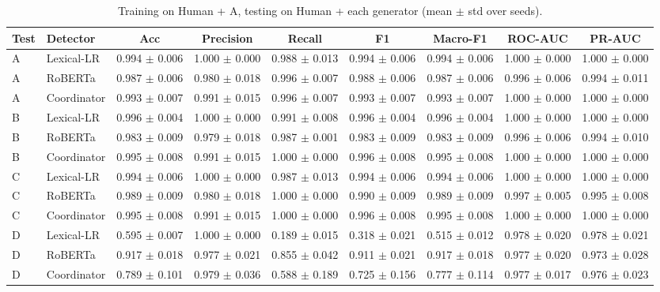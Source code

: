 \begin{table}[t]
\centering
\footnotesize
\caption{Training on Human + A, testing on Human + each generator (mean $\pm$ std over seeds).}
\label{tab:required}
\begin{tabular}{llccccccc}
\toprule
Test & Detector & Acc & Precision & Recall & F1 & Macro-F1 & ROC-AUC & PR-AUC \\
\midrule
A & Lexical-LR & 0.994 $\pm$ 0.006 & 1.000 $\pm$ 0.000 & 0.988 $\pm$ 0.013 & 0.994 $\pm$ 0.006 & 0.994 $\pm$ 0.006 & 1.000 $\pm$ 0.000 & 1.000 $\pm$ 0.000 \\
A & RoBERTa & 0.987 $\pm$ 0.006 & 0.980 $\pm$ 0.018 & 0.996 $\pm$ 0.007 & 0.988 $\pm$ 0.006 & 0.987 $\pm$ 0.006 & 0.996 $\pm$ 0.006 & 0.994 $\pm$ 0.011 \\
A & Coordinator & 0.993 $\pm$ 0.007 & 0.991 $\pm$ 0.015 & 0.996 $\pm$ 0.007 & 0.993 $\pm$ 0.007 & 0.993 $\pm$ 0.007 & 1.000 $\pm$ 0.000 & 1.000 $\pm$ 0.000 \\
B & Lexical-LR & 0.996 $\pm$ 0.004 & 1.000 $\pm$ 0.000 & 0.991 $\pm$ 0.008 & 0.996 $\pm$ 0.004 & 0.996 $\pm$ 0.004 & 1.000 $\pm$ 0.000 & 1.000 $\pm$ 0.000 \\
B & RoBERTa & 0.983 $\pm$ 0.009 & 0.979 $\pm$ 0.018 & 0.987 $\pm$ 0.001 & 0.983 $\pm$ 0.009 & 0.983 $\pm$ 0.009 & 0.996 $\pm$ 0.006 & 0.994 $\pm$ 0.010 \\
B & Coordinator & 0.995 $\pm$ 0.008 & 0.991 $\pm$ 0.015 & 1.000 $\pm$ 0.000 & 0.996 $\pm$ 0.008 & 0.995 $\pm$ 0.008 & 1.000 $\pm$ 0.000 & 1.000 $\pm$ 0.000 \\
C & Lexical-LR & 0.994 $\pm$ 0.006 & 1.000 $\pm$ 0.000 & 0.987 $\pm$ 0.013 & 0.994 $\pm$ 0.006 & 0.994 $\pm$ 0.006 & 1.000 $\pm$ 0.000 & 1.000 $\pm$ 0.000 \\
C & RoBERTa & 0.989 $\pm$ 0.009 & 0.980 $\pm$ 0.018 & 1.000 $\pm$ 0.000 & 0.990 $\pm$ 0.009 & 0.989 $\pm$ 0.009 & 0.997 $\pm$ 0.005 & 0.995 $\pm$ 0.008 \\
C & Coordinator & 0.995 $\pm$ 0.008 & 0.991 $\pm$ 0.015 & 1.000 $\pm$ 0.000 & 0.996 $\pm$ 0.008 & 0.995 $\pm$ 0.008 & 1.000 $\pm$ 0.000 & 1.000 $\pm$ 0.000 \\
D & Lexical-LR & 0.595 $\pm$ 0.007 & 1.000 $\pm$ 0.000 & 0.189 $\pm$ 0.015 & 0.318 $\pm$ 0.021 & 0.515 $\pm$ 0.012 & 0.978 $\pm$ 0.020 & 0.978 $\pm$ 0.021 \\
D & RoBERTa & 0.917 $\pm$ 0.018 & 0.977 $\pm$ 0.021 & 0.855 $\pm$ 0.042 & 0.911 $\pm$ 0.021 & 0.917 $\pm$ 0.018 & 0.977 $\pm$ 0.020 & 0.973 $\pm$ 0.028 \\
D & Coordinator & 0.789 $\pm$ 0.101 & 0.979 $\pm$ 0.036 & 0.588 $\pm$ 0.189 & 0.725 $\pm$ 0.156 & 0.777 $\pm$ 0.114 & 0.977 $\pm$ 0.017 & 0.976 $\pm$ 0.023 \\

\end{tabular}
\end{table}

